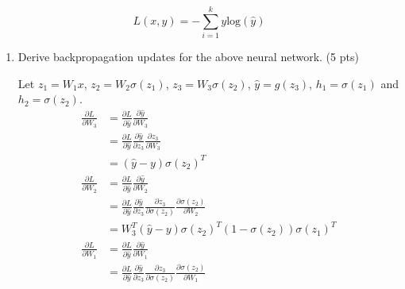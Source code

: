 \documentclass[10pt]{article}
\theoremstyle{definition}
\newenvironment{soln}{
    \leavevmode\color{blue}\ignorespaces
}{}
\begin{document}
\[
    L(x, y) = -\sum_{i=1}^k y \text{log}(\hat{y})
\]

\begin{enumerate}
    \item Derive backpropagation updates for the above neural network. (5 pts) \\
          \begin{soln}
              Let $z_1 = W_1x$, $z_2 = W_2\sigma(z_1)$, $z_3 = W_3\sigma(z_2)$, $\hat{y} = g(z_3)$, $h_1 = \sigma(z_1)$ and $h_2 = \sigma(z_2)$. \\
              \begin{align*}
                  \frac{\partial L}{\partial W_3} & = \frac{\partial L}{\partial \hat{y}} \frac{\partial \hat{y}}{\partial W_3}                                                                                     \\
                                                  & = \frac{\partial L}{\partial \hat{y}} \frac{\partial \hat{y}}{\partial z_3} \frac{\partial z_3}{\partial W_3}                                                   \\
                                                  & = (\hat{y} - y) \sigma(z_2) ^ T                                                                                                                                 \\
                  \frac{\partial L}{\partial W_2} & = \frac{\partial L}{\partial \hat{y}} \frac{\partial \hat{y}}{\partial W_2}                                                                                     \\
                                                  & = \frac{\partial L}{\partial \hat{y}} \frac{\partial \hat{y}}{\partial z_3} \frac{\partial z_3}{\partial \sigma(z_2)} \frac{\partial \sigma(z_2)}{\partial W_2} \\
                                                  & = W_3 ^ T (\hat{y} - y)  \sigma(z_2) ^ T (1 - \sigma(z_2)) \sigma(z_1) ^ T                                                                                      \\
                  \frac{\partial L}{\partial W_1} & = \frac{\partial L}{\partial \hat{y}} \frac{\partial \hat{y}}{\partial W_1}                                                                                     \\
                                                  & = \frac{\partial L}{\partial \hat{y}} \frac{\partial \hat{y}}{\partial z_3} \frac{\partial z_3}{\partial \sigma(z_2)} \frac{\partial \sigma(z_2)}{\partial W_1} \\

\end{align*}
\end{soln}
\end{enumerate}
\end{document}
